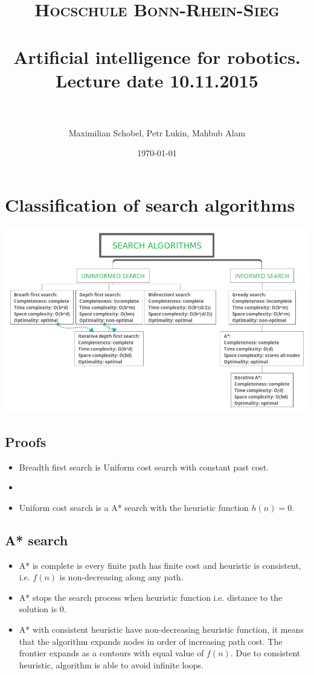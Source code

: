 \documentclass[paper=a4, fontsize=11pt]{scrartcl} %
\title{	
\normalfont \normalsize 
\textsc{Hocschule Bonn-Rhein-Sieg} \\ [25pt] %
\horrule{0.5pt} \\[0.4cm] %
\huge Artificial intelligence for robotics. Lecture date 10.11.2015 \\ %
\horrule{2pt} \\[0.5cm] %
}
\author{Maximilian Schobel, Petr Lukin, Mahbub Alam} %
\date{\normalsize\today} %
\numberwithin{equation}{section} %
\numberwithin{figure}{section} %
\numberwithin{table}{section} %
\begin{document}
\maketitle %

\newpage
\section{ Classification of search algorithms }
\begin{center}
\includegraphics[scale=0.5]{mindmap.png}
\end{center}


\subsection{ Proofs }
\begin{itemize}
\item Breadth first search is Uniform cost search with constant past cost.
\item
\item Uniform cost search is a A* search with the heuristic function $h(n) =0$.
\end{itemize}

\subsection{ A* search}

\begin{itemize}
\item A* is complete is every finite path has finite cost and heuristic is consistent, i.e. $f(n)$ is non-decreasing along any path.
\item A* stops the search process when heuristic function i.e. distance to the solution is 0.
\item A* with consistent heuristic have non-decreasing heuristic function, it means that the algorithm expands nodes in order of increasing path cost. The frontier expands as a contours with equal value of $f(n)$. Due to consistent heuristic, algorithm is able to avoid infinite loops.
\end{itemize}





\end{document}
